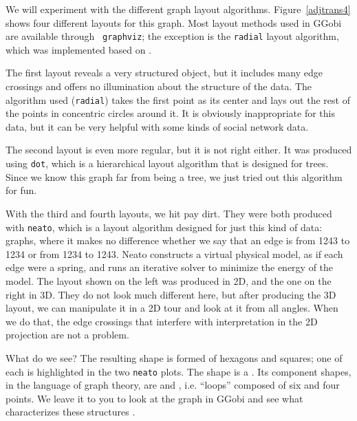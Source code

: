 We will experiment with the different graph layout algorithms.
Figure~\ref{adjtrans4} shows four different layouts for this graph.
Most layout methods used in GGobi are available through {\tt
graphviz}; the exception is the {\tt radial} layout algorithm, which
was implemented based on .

The first layout reveals a very structured object, but it includes
many edge crossings and offers no illumination about the structure of
the data.  The algorithm used ({\tt radial}) takes the first point as
its center and lays out the rest of the points in concentric circles
around it.  It is obviously inappropriate for this data, but it can be
very helpful with some kinds of social network data.

The second layout is even more regular, but it is not right either.
It was produced using {\tt dot}, which is a hierarchical layout
algorithm that is designed for trees.  Since we know this graph far
from being a tree, we just tried out this algorithm for fun.

With the third and fourth layouts, we hit pay dirt.  They were both
produced with {\tt neato}, which is a layout algorithm designed for
just this kind of data:  graphs, where it makes no
difference whether we say that an edge is from 1243 to 1234 or from
1234 to 1243.  Neato constructs a virtual physical model, as if each
edge were a spring, and runs an iterative solver to minimize the
energy of the model.  The layout shown on the left was produced in 2D,
and the one on the right in 3D.  They do not look much different here,
but after producing the 3D layout, we can manipulate it in a 2D tour
and look at it from all angles.  When we do that, the edge crossings
that interfere with interpretation in the 2D projection are not a
problem.

What do we see?  The resulting shape is formed of hexagons and
squares; one of each is highlighted in the two {\tt neato} plots.  The
shape is a .  Its component shapes, in the
language of graph theory, are  and , i.e. ``loops'' composed of six and four points.
We leave it to you to look at the graph in GGobi and see what
characterizes these structures \cite{LSDB92}.

